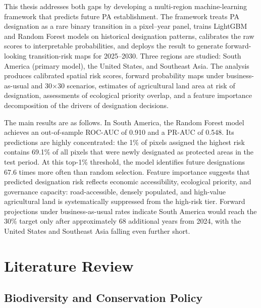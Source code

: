 \documentclass[12pt]{article}
\theoremstyle{break}
\begin{document}
This thesis addresses both gaps by developing a multi-region machine-learning
framework that predicts future PA establishment. The framework treats PA designation
as a rare binary transition in a pixel--year panel, trains LightGBM and Random Forest
models on historical designation patterns, calibrates the raw scores to interpretable
probabilities, and deploys the result to generate forward-looking transition-risk maps
for 2025--2030. Three regions are studied: South America (primary model), the 
United States, and Southeast Asia. The analysis produces calibrated
spatial risk scores, forward probability maps under business-as-usual and 30$\times$30
scenarios, estimates of agricultural land area at risk of designation, assessments of
ecological priority overlap, and a feature importance decomposition of the drivers of
designation decisions.

The main results are as follows. In South America, the Random Forest model achieves
an out-of-sample ROC-AUC of 0.910 and a PR-AUC of 0.548. Its predictions are highly
concentrated: the 1\% of pixels assigned the highest risk contains 69.1\% of all pixels that
were newly designated as protected areas in the test period. At this top-1\% threshold, the
model identifies future designations 67.6 times more often than random selection.
Feature importance suggests that predicted designation risk reflects economic
accessibility, ecological priority, and governance capacity: road-accessible, densely
populated, and high-value agricultural land is systematically suppressed from the
high-risk tier.
Forward projections under business-as-usual rates indicate South America would reach
the 30\% target only after approximately 68 additional years from 2024, with the
United States and Southeast Asia falling even further short.

\section{Literature Review}
\label{sec:literature}

\subsection{Biodiversity and Conservation Policy}
\label{sec:lit_biodiversity}
\end{document}
